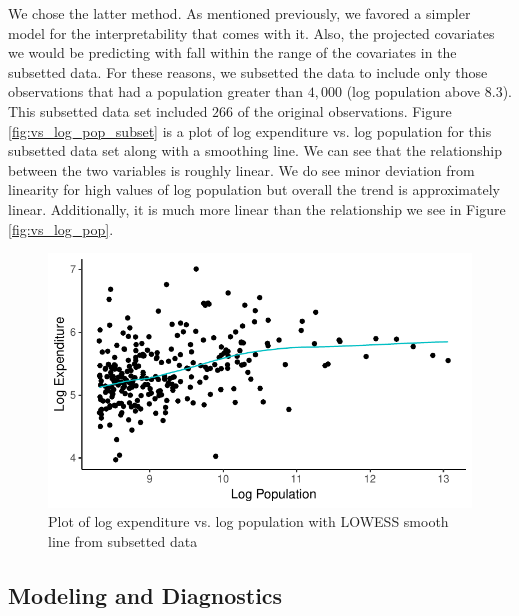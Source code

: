 \documentclass{article}\usepackage[]{graphicx}\usepackage[]{color}
\makeatletter
\def\maxwidth{ %
  \ifdim\Gin@nat@width>\linewidth
    \linewidth
  \else
    \Gin@nat@width
  \fi
}
\newenvironment{knitrout}{}{} %
\makeatother
\begin{document}
We chose the latter method. As mentioned previously, we favored a simpler model for the interpretability that comes with it. Also, the projected covariates we would be predicting with fall within the range of the covariates in the subsetted data. For these reasons, we subsetted the data to include only those observations that had a population greater than $4,000$ (log population above $8.3$). This subsetted data set included $266$ of the original observations. Figure \ref{fig:vs_log_pop_subset} is a plot of log expenditure vs. log population for this subsetted data set along with a smoothing line. We can see that the relationship between the two variables is roughly linear. We do see minor deviation from linearity for high values of log population but overall the trend is approximately linear. Additionally, it is much more linear than the relationship we see in Figure \ref{fig:vs_log_pop}.

\begin{knitrout}
\color{fgcolor}\begin{figure}[h]
\includegraphics[width=\maxwidth]{figure/r_fig_vs_log_pop_subset-1} \caption{\label{fig:vs_log_pop_subset} Plot of log expenditure vs. log population with LOWESS smooth line from subsetted data}\label{fig:r fig_vs_log_pop_subset}
\end{figure}


\end{knitrout}

\subsection{Modeling and Diagnostics} \label{modeling}
\end{document}
